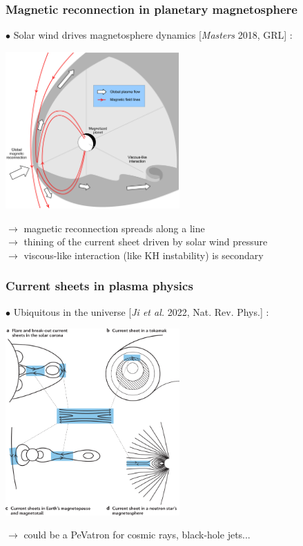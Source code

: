\documentclass{beamer}
\begin{document}
\begin{frame}
\frametitle{Magnetic reconnection in planetary magnetosphere}

$\bullet$ Solar wind drives magnetosphere dynamics [\textit{Masters} 2018, GRL] : \\[0.4cm]

\begin{center}
\includegraphics[width=0.5\textwidth]{magnetosphere_masters2018.jpg}
\end{center}

$\to$ magnetic reconnection spreads along a line \\
$\to$ thining of the current sheet driven by solar wind pressure \\
$\to$ viscous-like interaction (like KH instability) is secondary \\

\end{frame}





\begin{frame}
\frametitle{Current sheets in plasma physics}

$\bullet$ Ubiquitous in the universe [\textit{Ji et al.} 2022, Nat. Rev. Phys.] : \\[0.4cm]

\begin{center}
\includegraphics[width=0.5\textwidth]{current_sheet_ji2022.png}
\end{center}

$\to$ could be a PeVatron for cosmic rays, black-hole jets... \\

\end{frame}
\end{document}
